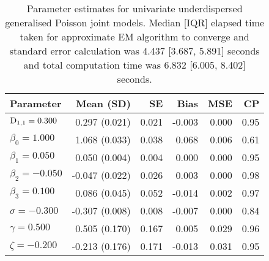 \begin{table}[ht]
\centering
{}
\captionsetup{font=scriptsize}
\begingroup\scriptsize
\begin{tabular}{l|rrrrr}
  Parameter & Mean (SD) & SE & Bias & MSE & CP \\ 
  \hline
  $\mathrm{D}_{1,1} = 0.300$ &  0.297 (0.021) & 0.021 & -0.003 & 0.000 & 0.95 \\ 
  $\beta_{0} = 1.000$ &  1.068 (0.033) & 0.038 &  0.068 & 0.006 & 0.61 \\ 
  $\beta_{1} = 0.050$ &  0.050 (0.004) & 0.004 &  0.000 & 0.000 & 0.95 \\ 
  $\beta_{2} = -0.050$ & -0.047 (0.022) & 0.026 &  0.003 & 0.000 & 0.98 \\ 
  $\beta_{3} = 0.100$ &  0.086 (0.045) & 0.052 & -0.014 & 0.002 & 0.97 \\ 
  $\sigma = -0.300$ & -0.307 (0.008) & 0.008 & -0.007 & 0.000 & 0.84 \\ 
  $\gamma = 0.500$ &  0.505 (0.170) & 0.167 &  0.005 & 0.029 & 0.96 \\ 
  $\zeta = -0.200$ & -0.213 (0.176) & 0.171 & -0.013 & 0.031 & 0.95 \\ 
   \hline
\end{tabular}
\endgroup
\caption{Parameter estimates for univariate underdispersed generalised Poisson joint models. Median [IQR] elapsed time taken for approximate EM algorithm to converge and standard error calculation was 4.437 [3.687, 5.891] seconds and total computation time was 6.832 [6.005, 8.402] seconds.} 
\end{table}

